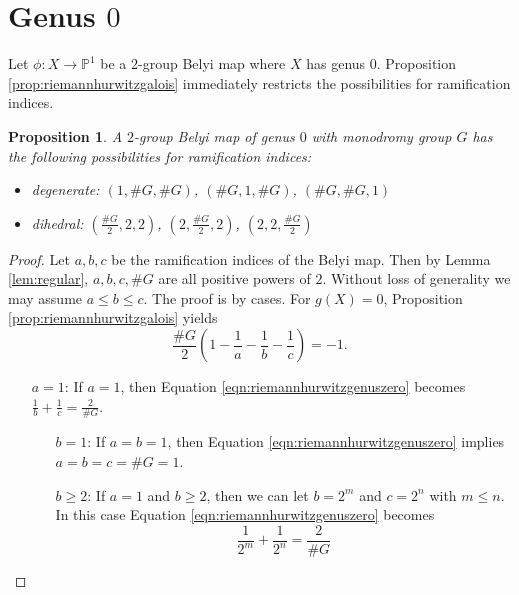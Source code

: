 \documentclass{dcthesis}
\newcommand{\PP}{\mathbb P}
\numberwithin{equation}{section}
\newtheorem{prop}[equation]{Proposition}
\theoremstyle{definition}
\theoremstyle{remark}
\begin{document}
{  \section{Genus $0$}{\label{sec:genuszero}
    Let $\phi:X\to\PP^1$ be a $2$-group Belyi map where $X$ has genus $0$.
    Proposition \ref{prop:riemannhurwitzgalois} immediately restricts the
    possibilities for ramification indices.
    \begin{prop}\label{prop:genuszeroramification}
      A $2$-group Belyi map of genus $0$ with monodromy group $G$
      has the following possibilities for ramification indices:
      \begin{itemize}
        \item degenerate: $(1,\#G, \#G)$, $(\#G, 1, \#G)$, $(\#G, \#G, 1)$
        \item
          dihedral:
          $\left(\frac{\#G}{2}, 2, 2\right)$,
          $\left(2, \frac{\#G}{2}, 2\right)$,
          $\left(2, 2, \frac{\#G}{2}\right)$
      \end{itemize}
    \end{prop}
    \begin{proof}
      Let $a,b,c$ be the ramification indices of the Belyi map.
      Then by Lemma \ref{lem:regular},
      $a,b,c,\#G$ are all positive powers of $2$.
      Without loss of generality we may assume $a\le b\le c$.
      The proof is by cases.
      For $g(X)=0$, Proposition \ref{prop:riemannhurwitzgalois}
      yields
      \begin{equation}\label{eqn:riemannhurwitzgenuszero}
        \frac{\#G}{2}\left(1-\frac{1}{a}-\frac{1}{b}-\frac{1}{c}\right) = -1.
      \end{equation}
      \begin{itemize}
        \item[\underline{$a=1$}:]
          If $a=1$, then
          Equation \ref{eqn:riemannhurwitzgenuszero} becomes
          $\frac{1}{b}+\frac{1}{c}=\frac{2}{\#G}$.
          \begin{itemize}
            \item[\underline{$b=1$}:]
              If $a=b=1$, then
              Equation \ref{eqn:riemannhurwitzgenuszero}
              implies $a=b=c=\#G=1$.
            \item[\underline{$b\ge 2$}:]
              If $a=1$ and $b\geq 2$,
              then we can let $b=2^m$ and $c=2^n$ with $m\le n$.
              In this case
              Equation \ref{eqn:riemannhurwitzgenuszero} becomes
              \[
                \frac{1}{2^m}+\frac{1}{2^n} = \frac{2}{\#G}
\]
\end{itemize}
\end{itemize}
\end{proof}}}
\end{document}
